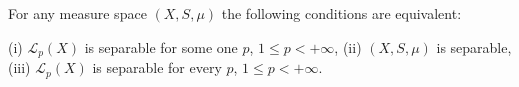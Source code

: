 For any measure space $(X, S, \mu)$ the following conditions are equivalent:

(i) $\mathcal{L}_p(X)$ is separable for some one $p$, $1 \leq p < +\infty$,
(ii) $(X, S, \mu)$ is separable,
(iii) $\mathcal{L}_p(X)$ is separable for every $p$, $1 \leq p < +\infty$.
